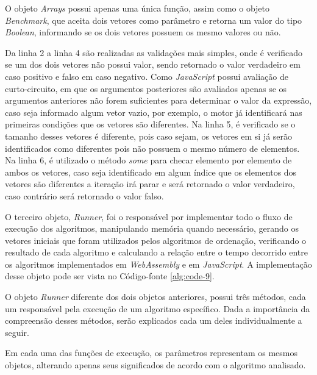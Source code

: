 

O objeto \textit{Arrays} possui apenas uma única função, assim como o objeto
\textit{Benchmark}, que aceita dois vetores como parâmetro e retorna um valor do tipo
\textit{Boolean}, informando se os dois vetores possuem os mesmo valores ou não.

Da linha 2 a linha 4 são realizadas as validações mais simples, onde é verificado se um
dos dois vetores não possui valor, sendo retornado o valor verdadeiro em caso positivo e
falso em caso negativo. Como \textit{JavaScript} possui avaliação de curto-circuito, em
que os argumentos posteriores são avaliados apenas se os argumentos anteriores não forem
suficientes para determinar o valor da expressão, caso seja informado algum vetor vazio,
por exemplo, o motor já identificará nas primeiras condições que os vetores são
diferentes. Na linha 5, é verificado se o tamanho desses vetores é diferente, pois caso
sejam, os vetores em si já serão identificados como diferentes pois não possuem o mesmo
número de elementos. Na linha 6, é utilizado o método \textit{some} para checar elemento
por elemento de ambos os vetores, caso seja identificado em algum índice que os elementos
dos vetores são diferentes a iteração irá parar e será retornado o valor verdadeiro, caso
contrário será retornado o valor falso.

O terceiro objeto, \textit{Runner}, foi o responsável por implementar todo o fluxo de
execução dos algoritmos, manipulando memória quando necessário, gerando os vetores
iniciais que foram utilizados pelos algoritmos de ordenação, verificando o resultado de
cada algoritmo e calculando a relação entre o tempo decorrido entre os algoritmos
implementados em \textit{WebAssembly} e em \textit{JavaScript}. A implementação desse
objeto pode ser vista no Código-fonte \ref{alg:code-9}.



O objeto \textit{Runner} diferente dos dois objetos anteriores, possui três métodos, cada
um responsável pela execução de um algoritmo específico. Dada a importância da compreensão
desses métodos, serão explicados cada um deles individualmente a seguir.

Em cada uma das funções de execução, os parâmetros representam os mesmos objetos,
alterando apenas seus significados de acordo com o algoritmo analisado.

